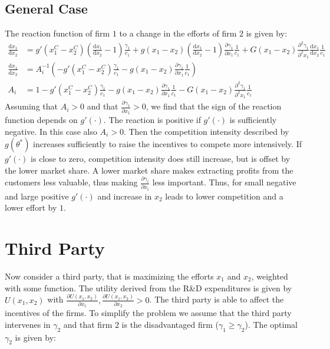 \documentclass[a4paper, 11pt]{article}
\renewcommand{\d}{\text{d}}
\begin{document}
\subsection{General Case}
The reaction function of firm $1$ to a change in the efforts of firm $2$ is given by:
\begin{align}
\frac{\d x_1}{\d x_2} &= g'(x_1^C-x_2^C)\left(\frac{\d x_1}{\d x_2}-1\right)\frac{\gamma_1}{c_1} + g(x_1-x_2)\left(\frac{\d x_1}{\d x_2}-1\right)\frac{\partial \gamma_1}{\partial x_1}\frac{1}{c_1} + G(x_1-x_2)\frac{\partial^2 \gamma_1}{\partial^2 x_1}\frac{\d x_1}{\d x_2}\frac{1}{c_1}\\
\frac{\d x_1}{\d x_2} &= A_i^{-1} \left(-g'(x_1^C-x_2^C)\frac{\gamma_1}{c_1} - g(x_1-x_2)\frac{\partial \gamma_1}{\partial x_1}\frac{1}{c_1}\right)\\
A_i &= 1 - g'(x_1^C-x_2^C)\frac{\gamma_1}{c_1}-g(x_1-x_2)\frac{\partial \gamma_1}{\partial x_1}\frac{1}{c_1}-G(x_1-x_2)\frac{\partial^2 \gamma_1}{\partial^2 x_1}\frac{1}{c_1}
\end{align}
Assuming that $A_i>0$ and that $\frac{\partial \gamma_1}{\partial x_1}>0$, we find that the sign of the reaction function depends on $g'(\cdot)$. The reaction is positive if $g'(\cdot)$ is sufficiently negative. In this case also $A_i>0$. Then the competition intensity described by $g(\theta^*)$ increases sufficiently to raise the incentives to compete more intensively. If $g'(\cdot)$ is close to zero, competition intensity does still increase, but is offset by the lower market share. A lower market share makes extracting profits from the customers less valuable, thus making $\frac{\partial \gamma_i}{\partial x_i}$ less important. Thus, for small negative and large positive $g'(\cdot)$ and increase in $x_2$ leads to lower competition and a lower effort by $1$. %

\section{Third Party}

Now consider a third party, that is maximizing the efforts $x_1$ and $x_2$, weighted with some function. The utility derived from the R\&D expenditures is given by $U(x_1,x_2)$ with $\frac{\partial U(x_1,x_2)}{\partial x_1},\frac{\partial U(x_1,x_2)}{\partial x_2}>0$. The third party is able to affect the incentives of the firms. To simplify the problem we assume that the third party intervenes in $\gamma_2$ and that firm $2$ is the disadvantaged firm ($\gamma_1\geq\gamma_2$). The optimal $\gamma_2$ is given by:
\end{document}
